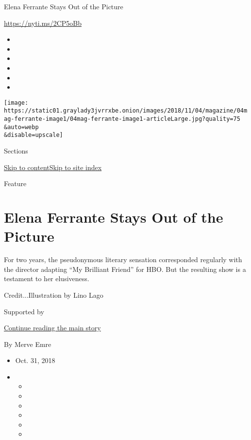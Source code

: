Elena Ferrante Stays Out of the Picture

\url{https://nyti.ms/2CP5oBb}

\begin{itemize}
\item
\item
\item
\item
\item
\item
\end{itemize}

\texttt{[image: https://static01.graylady3jvrrxbe.onion/images/2018/11/04/magazine/04mag-ferrante-image1/04mag-ferrante-image1-articleLarge.jpg?quality=75\\\&auto=webp\\\&disable=upscale]}

Sections

\protect\hyperlink{site-content}{Skip to
content}\protect\hyperlink{site-index}{Skip to site index}

Feature

\hypertarget{elena-ferrante-stays-out-of-the-picture}{%
\section{Elena Ferrante Stays Out of the
Picture}\label{elena-ferrante-stays-out-of-the-picture}}

For two years, the pseudonymous literary sensation corresponded
regularly with the director adapting ``My Brilliant Friend'' for HBO.
But the resulting show is a testament to her elusiveness.

Credit...Illustration by Lino Lago

Supported by

\protect\hyperlink{after-sponsor}{Continue reading the main story}

By Merve Emre

\begin{itemize}
\item
  Oct. 31, 2018
\item
  \begin{itemize}
  \item
  \item
  \item
  \item
  \item
  \item
  \end{itemize}
\end{itemize}

